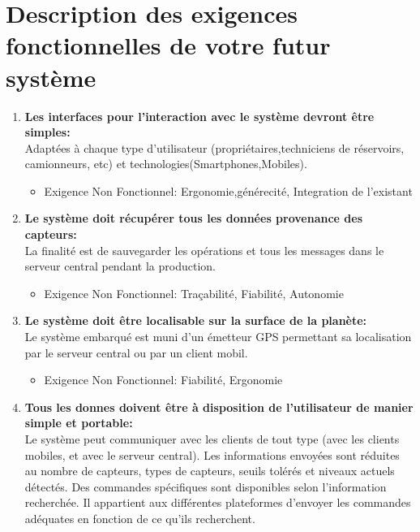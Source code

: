 \section{Description des exigences fonctionnelles de votre futur système}
\begin{enumerate}



\item  \textbf{Les interfaces pour l'interaction avec le système devront être simples:}\\
Adaptées à chaque type d'utilisateur (propriétaires,techniciens de réservoirs, camionneurs, etc) et technologies(Smartphones,Mobiles).
\begin{itemize}

\item Exigence Non Fonctionnel: Ergonomie,générecité, Integration de l'existant
\end{itemize}
\item  \textbf{Le système doit récupérer tous les données provenance des capteurs:}\\
La finalité est de sauvegarder les opérations et tous les messages dans le serveur central pendant la production.
\begin{itemize}

\item Exigence Non Fonctionnel: Traçabilité, Fiabilité, Autonomie
\end{itemize}
\item  \textbf{Le système doit être localisable sur la surface de la planète:}\\
Le système embarqué est muni d'un émetteur GPS permettant sa localisation par le serveur central ou par un client mobil.
\begin{itemize}

\item Exigence Non Fonctionnel: Fiabilité, Ergonomie
\end{itemize}
\item  \textbf{Tous les donnes doivent être à disposition de l'utilisateur de manier simple et portable:}\\
Le système peut communiquer avec les clients de tout type (avec les clients mobiles, et avec le serveur central). Les informations envoyées sont réduites au nombre de capteurs, types de capteurs, seuils tolérés et niveaux actuels détectés. Des commandes spécifiques sont disponibles selon l'information recherchée. Il appartient aux différentes plateformes d'envoyer les commandes adéquates en fonction de ce qu'ils recherchent.
\begin{itemize}


\end{itemize}
\end{enumerate}

